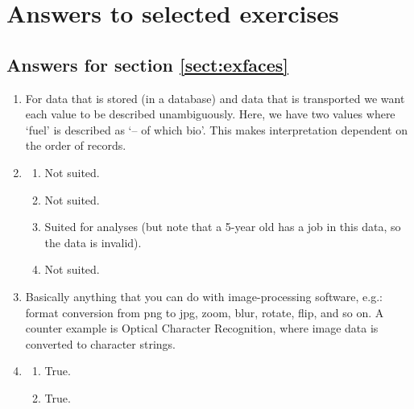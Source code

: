 \appendix
\chapter{Answers to selected exercises}
\label{sect:answers}

\section*{Answers for section \ref{sect:exfaces}}
\label{sect:ansfaces}
\begin{enumerate}
  \item For data that is stored (in a database) and data that is transported
        we want each value to be described unambiguously. Here, we have
        two values where `fuel' is described as `-- of which bio'. This makes
        interpretation dependent on the order of records.
  \addtocounter{enumi}{2}
\item 
  \begin{enumerate}
  \item Not suited.%
  \item Not suited.%
  \item Suited for analyses (but note that a 5-year old has a job in this data,
        so the data is invalid).
  \item Not suited.%
  \end{enumerate}
  \item Basically anything that you can do with image-processing software, e.g.: format conversion
        from png to jpg, zoom, blur, rotate, flip, and so on. A counter example is Optical Character
        Recognition, where image data is converted to character strings.
  \item \begin{enumerate}
  \item True. %
  \item True. %

\end{enumerate}
\end{enumerate}
